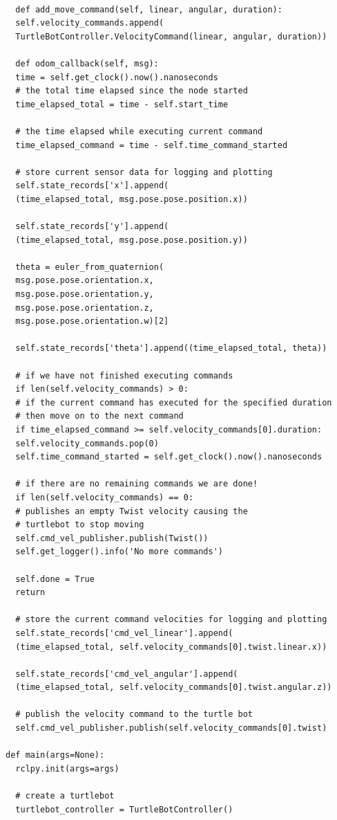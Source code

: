 \documentclass{article}
\begin{document}
\begin{verbatim}
  
  def add_move_command(self, linear, angular, duration):
  self.velocity_commands.append(
  TurtleBotController.VelocityCommand(linear, angular, duration))
  
  def odom_callback(self, msg):
  time = self.get_clock().now().nanoseconds
  # the total time elapsed since the node started
  time_elapsed_total = time - self.start_time

  # the time elapsed while executing current command
  time_elapsed_command = time - self.time_command_started

  # store current sensor data for logging and plotting
  self.state_records['x'].append(
  (time_elapsed_total, msg.pose.pose.position.x))

  self.state_records['y'].append(
  (time_elapsed_total, msg.pose.pose.position.y))

  theta = euler_from_quaternion(
  msg.pose.pose.orientation.x,
  msg.pose.pose.orientation.y,
  msg.pose.pose.orientation.z,
  msg.pose.pose.orientation.w)[2]
  
  self.state_records['theta'].append((time_elapsed_total, theta))

  # if we have not finished executing commands
  if len(self.velocity_commands) > 0:
  # if the current command has executed for the specified duration
  # then move on to the next command
  if time_elapsed_command >= self.velocity_commands[0].duration:
  self.velocity_commands.pop(0)
  self.time_command_started = self.get_clock().now().nanoseconds

  # if there are no remaining commands we are done!
  if len(self.velocity_commands) == 0:
  # publishes an empty Twist velocity causing the 
  # turtlebot to stop moving
  self.cmd_vel_publisher.publish(Twist())
  self.get_logger().info('No more commands')

  self.done = True
  return
  
  # store the current command velocities for logging and plotting
  self.state_records['cmd_vel_linear'].append(
  (time_elapsed_total, self.velocity_commands[0].twist.linear.x))
  
  self.state_records['cmd_vel_angular'].append(
  (time_elapsed_total, self.velocity_commands[0].twist.angular.z))
  
  # publish the velocity command to the turtle bot
  self.cmd_vel_publisher.publish(self.velocity_commands[0].twist)

def main(args=None):
  rclpy.init(args=args)

  # create a turtlebot
  turtlebot_controller = TurtleBotController()


\end{verbatim}
\end{document}
